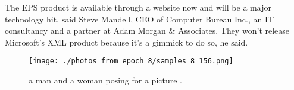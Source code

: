 \documentclass{article}%
\begin{document}
The EPS product is available through a website now and will be a major technology hit, said Steve Mandell, CEO of Computer Bureau Inc., an IT consultancy and a partner at Adam Morgan \& Associates.\newline%
They won't release Microsoft's XML product because it's a gimmick to do so, he said.\newline%

%


\begin{figure}[h!]%
\centering%
\texttt{[image: ./photos\_from\_epoch\_8/samples\_8\_156.png]}%
\caption{a man and a woman posing for a picture .}%
\end{figure}

%
\end{document}
